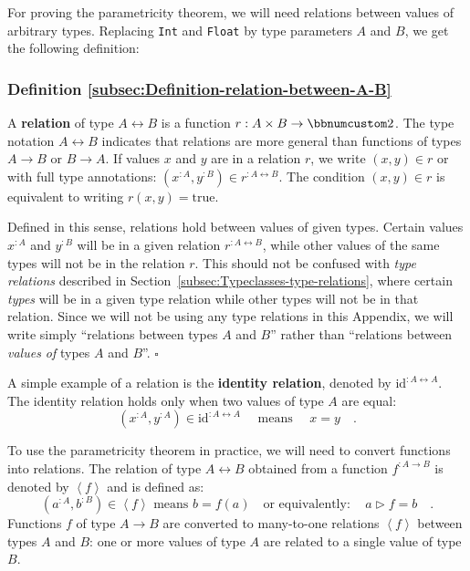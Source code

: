 For proving the parametricity theorem, we will need relations between
values of arbitrary types. Replacing \lstinline!Int! and \lstinline!Float!
by type parameters $A$ and $B$, we get the following definition:

\subsubsection{Definition \label{subsec:Definition-relation-between-A-B}\ref{subsec:Definition-relation-between-A-B}}

A \textbf{relation} of
type $A\leftrightarrow B$ is a function $r:A\times B\rightarrow\bbnum 2$.
The type notation $A\leftrightarrow B$ indicates that relations are
more general than functions of types $A\rightarrow B$ or $B\rightarrow A$.
If values $x$ and $y$ are in a relation $r$, we write $(x,y)\in r$
or with full type annotations: $(x^{:A},y^{:B})\in r^{:A\leftrightarrow B}$.
The condition $(x,y)\in r$ is equivalent to writing $r(x,y)=\text{true}$. 

Defined in this sense, relations hold between values of given types.
Certain values $x^{:A}$ and $y^{:B}$ will be in a given relation
$r^{:A\leftrightarrow B}$, while other values of the same types will
not be in the relation $r$. This should not be confused with \emph{type
relations} described in Section~\ref{subsec:Typeclasses-type-relations},
where certain \emph{types} will be in a given type relation while
other types will not be in that relation. Since we will not be using
any type relations in this Appendix, we will write simply \textsf{``}relations
between types $A$ and $B$\textsf{''} rather than \textsf{``}relations between \emph{values
of} types $A$ and $B$\textsf{''}. $\square$

A simple example of a relation is the \textbf{identity relation},
denoted by $\text{id}^{:A\leftrightarrow A}$. The identity relation
holds only when two values of type $A$ are equal:
\[
(x^{:A},y^{:A})\in\text{id}^{:A\leftrightarrow A}\quad\text{ means }\quad x=y\quad.
\]

To use the parametricity theorem in practice, we will need to convert
functions into relations. The relation of type $A\leftrightarrow B$
obtained from a function $f^{:A\rightarrow B}$ is denoted by $\left<f\right>$
and is defined as:
\[
(a^{:A},b^{:B})\in\left<f\right>\text{ means }b=f(a)\quad\text{or equivalently}:\quad a\triangleright f=b\quad.
\]
Functions $f$ of type $A\rightarrow B$ are converted to many-to-one
relations $\left<f\right>$ between types $A$ and $B$: one or more
values of type $A$ are related to a single value of type $B$.

